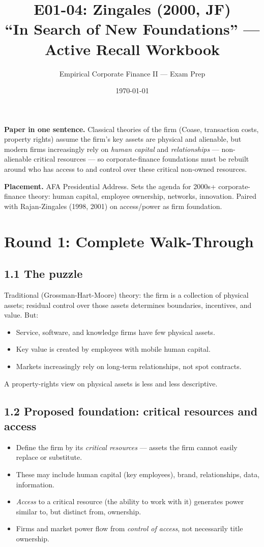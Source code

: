 \documentclass[11pt]{article}
\title{E01-04: Zingales (2000, JF) \\
\large ``In Search of New Foundations'' --- Active Recall Workbook}
\author{Empirical Corporate Finance II --- Exam Prep}
\date{\today}
\begin{document}
\maketitle

\begin{keybox}
\textbf{Paper in one sentence.} Classical theories of the firm (Coase, transaction costs, property rights) assume the firm's key assets are physical and alienable, but modern firms increasingly rely on \emph{human capital} and \emph{relationships} --- non-alienable critical resources --- so corporate-finance foundations must be rebuilt around who has access to and control over these critical non-owned resources.

\textbf{Placement.} AFA Presidential Address. Sets the agenda for 2000s+ corporate-finance theory: human capital, employee ownership, networks, innovation. Paired with Rajan-Zingales (1998, 2001) on access/power as firm foundation.
\end{keybox}

\section*{Round 1: Complete Walk-Through}

\subsection*{1.1 The puzzle}
Traditional (Grossman-Hart-Moore) theory: the firm is a collection of physical assets; residual control over those assets determines boundaries, incentives, and value. But:
\begin{itemize}
\item Service, software, and knowledge firms have few physical assets.
\item Key value is created by employees with mobile human capital.
\item Markets increasingly rely on long-term relationships, not spot contracts.
\end{itemize}
A property-rights view on physical assets is less and less descriptive.

\subsection*{1.2 Proposed foundation: critical resources and access}
\begin{itemize}
\item Define the firm by its \emph{critical resources} --- assets the firm cannot easily replace or substitute.
\item These may include human capital (key employees), brand, relationships, data, information.
\item \emph{Access} to a critical resource (the ability to work with it) generates power similar to, but distinct from, ownership.
\item Firms and market power flow from \emph{control of access}, not necessarily title ownership.
\end{itemize}
\end{document}
